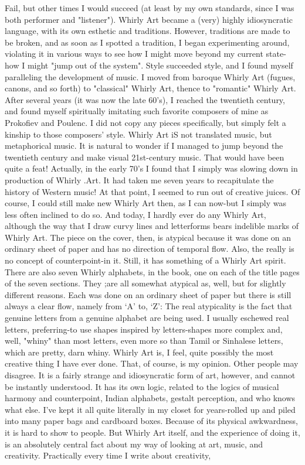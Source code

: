 Fail, but other times I would succeed (at least by my own standards, since I was both
performer and "listener").
         Whirly Art became a (very) highly idiosyncratic language, with its own
esthetic and traditions. However, traditions are made to be broken, and as soon as I
spotted a tradition, I began experimenting around, violating it in various ways to see
how I might move beyond my current state-how I might "jump out of the system".
Style succeeded style, and I found myself paralleling the development of music. I
moved from baroque Whirly Art (fugues, canons, and so forth) to "classical" Whirly
Art, thence to "romantic" Whirly Art. After several years (it was now the late 60's), I
reached the twentieth century, and found myself spiritually imitating such
favorite composers of mine as Prokofiev and Poulenc. I did not copy any pieces
specifically, but simply felt a kinship to those composers' style. Whirly Art iS not
translated music, but metaphorical music.
         It is natural to wonder if I managed to jump beyond the twentieth century and
make visual 21st-century music. That would have been quite a feat! Actually, in the
early 70's I found that I simply was slowing down in production of Whirly .Art. It had
taken me seven years to recapitulate the history of Western music! At that point, I
seemed to run out of creative juices. Of course, I could still make new Whirly Art
then, as I can now-but I simply was less often inclined to do so. And today, I hardly
ever do any Whirly Art, although the way that I draw curvy lines and letterforms
bears indelible marks of Whirly Art.
         The piece on the cover, then, is atypical because it was done on an ordinary
sheet of paper and has no direction of temporal flow. Also, the really is no concept of
counterpoint-in it. Still, it has something of a Whirly Art spirit. There are also seven
Whirly alphabets, in the book, one on each of the title pages of the seven sections.
They ;are all somewhat atypical as, well, but for slightly different reasons. Each was
done on an ordinary sheet of paper but there is still always a clear flow, namely from
`A' to, `Z': The real atypicality is the fact that genuine letters from a genuine alphabet
are being used. I usually eschewed real letters, preferring-to use shapes inspired by
letters-shapes more complex and, well, "whiny" than most letters, even more so than
Tamil or Sinhalese letters, which are pretty, darn whiny.
         Whirly Art is, I feel, quite possibly the most creative thing I have ever done.
That, of course, is my opinion. Other people may disagree. It is a fairly strange and
idiosyncratic form of art, however, and cannot be instantly understood. It has its own
logic, related to the logics of musical harmony
and counterpoint, Indian alphabets, gestalt perception, and who knows what else. I've
kept it all quite literally in my closet for years-rolled up and piled into many paper
bags and cardboard boxes. Because of its physical awkwardness, it is hard to show to
people. But Whirly Art itself, and the experience of doing it, is an absolutely central
fact about my way of looking at art, music, and creativity. Practically every time I
write about creativity,




